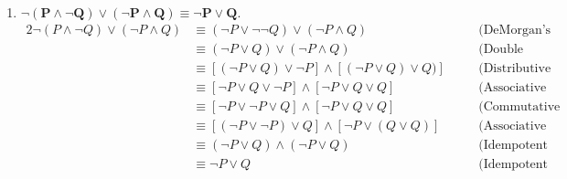 \begin{enumerate}[label=(\alph*)]
    \item \textbf{$\bm{\neg (P \wedge \neg Q) \vee (\neg P \wedge Q) \equiv \neg P \vee Q.}$}
        \begin{alignat*}{2}
            \neg (P \wedge \neg Q) \vee (\neg P \wedge Q) &\equiv (\neg P \vee \neg \neg Q) \vee (\neg P \wedge Q) && \quad \text{(DeMorgan's Law)} \\
            &\equiv (\neg P \vee Q) \vee (\neg P \wedge Q) && \quad \text{(Double Negation Law)} \\ 
            &\equiv [(\neg P \vee Q) \vee \neg P] \wedge [(\neg P \vee Q) \vee Q)] && \quad \text{(Distributive Law)} \\ 
            &\equiv [\neg P \vee Q \vee \neg P] \wedge [\neg P \vee Q \vee Q] && \quad \text{(Associative Law)} \\ 
            &\equiv [\neg P \vee \neg P \vee Q] \wedge [\neg P \vee Q \vee Q] && \quad \text{(Commutative Law)} \\ 
            &\equiv [(\neg P \vee \neg P) \vee Q] \wedge [\neg P \vee (Q \vee Q)] && \quad \text{(Associative Law)} \\ 
            &\equiv (\neg P \vee Q) \wedge (\neg P \vee Q) && \quad \text{(Idempotent Law)} \\ 
            &\equiv \neg P \vee Q && \quad \text{(Idempotent Law)} \\ 
        \end{alignat*}
\end{enumerate}

\pagebreak